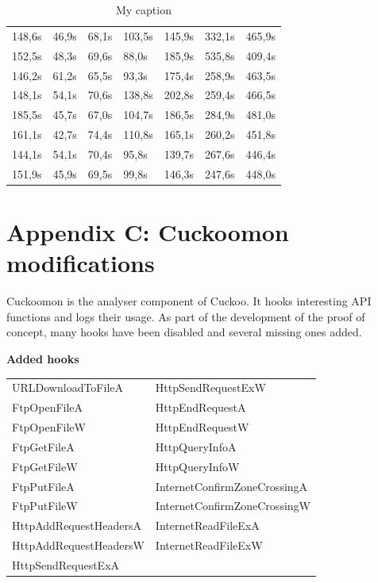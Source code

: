 \documentclass{scrartcl}
\begin{document}
\begin{table}[h]
\begin{tabular}{@{}lllllll@{}}
148,6s    & 46,9s      & 68,1s      & 103,5s      & 145,9s      & 332,1s      & 465,9s       \\
152,5s    & 48,3s      & 69,6s      & 88,0s       & 185,9s      & 535,8s      & 409,4s       \\
146,2s    & 61,2s      & 65,5s      & 93,3s       & 175,4s      & 258,9s      & 463,5s       \\
148,1s    & 54,1s      & 70,6s      & 138,8s      & 202,8s      & 259,4s      & 466,5s       \\
185,5s    & 45,7s      & 67,0s      & 104,7s      & 186,5s      & 284,9s      & 481,0s       \\
161,1s    & 42,7s      & 74,4s      & 110,8s      & 165,1s      & 260,2s      & 451,8s       \\
144,1s    & 54,1s      & 70,4s      & 95,8s       & 139,7s      & 267,6s      & 446,4s       \\
151,9s    & 45,9s      & 69,5s      & 99,8s       & 146,3s      & 247,6s      & 448,0s       \\ \bottomrule
\end{tabular}
\caption{My caption}
\label{my-label}
\end{table}

\clearpage

\section*{Appendix C: Cuckoomon modifications}
\label{cuckoomonmods}

Cuckoomon is the analyser component of Cuckoo. It hooks interesting API functions and logs their usage. As part of the development of the proof of concept, many hooks have been disabled and several missing ones added.

\textbf{Added hooks}

\begin{longtable}{*{2}{>{\arraybackslash}p{6cm}}}
URLDownloadToFileA     & HttpSendRequestExW           \\
FtpOpenFileA           & HttpEndRequestA              \\
FtpOpenFileW           & HttpEndRequestW              \\
FtpGetFileA            & HttpQueryInfoA               \\
FtpGetFileW            & HttpQueryInfoW               \\
FtpPutFileA            & InternetConfirmZoneCrossingA \\
FtpPutFileW            & InternetConfirmZoneCrossingW \\
HttpAddRequestHeadersA & InternetReadFileExA          \\
HttpAddRequestHeadersW & InternetReadFileExW          \\
HttpSendRequestExA     &                             
\end{longtable}
\end{document}
